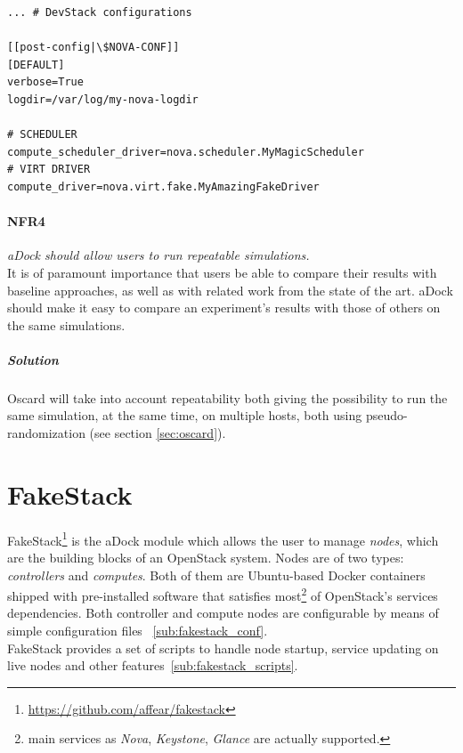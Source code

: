 \begin{lstlisting}[title=Adding per-service configuration to DevStack's local.conf file]
... # DevStack configurations

[[post-config|\$NOVA-CONF]]
[DEFAULT]
verbose=True
logdir=/var/log/my-nova-logdir

# SCHEDULER
compute_scheduler_driver=nova.scheduler.MyMagicScheduler
# VIRT DRIVER
compute_driver=nova.virt.fake.MyAmazingFakeDriver
\end{lstlisting}


\paragraph{NFR4}\label{p:nfr4} \emph{aDock should allow users to run repeatable simulations.} \hfill \\
It is of paramount importance that users be able to compare their results with baseline approaches, as well as with related work from the state of the art. aDock should make it easy to compare an experiment's results with those of others on the same simulations.

\subparagraph{Solution} Oscard will take into account repeatability both giving the possibility to run the same simulation, at the same time, on multiple hosts, both using pseudo-randomization (see section \ref{sec:oscard}).


\section{FakeStack}
\label{sec:fakestack}
FakeStack\footnote{\url{https://github.com/affear/fakestack}} is the aDock module which allows the user to manage \textit{nodes}, which are the building blocks of an OpenStack system. Nodes are of two types: \textit{controllers} and \textit{computes}. Both of them are Ubuntu-based Docker containers shipped with pre-installed software that satisfies most\footnote{main services as \textit{Nova}, \textit{Keystone}, \textit{Glance} are actually supported.} of OpenStack's services dependencies. Both controller and compute nodes are configurable by means of simple configuration files ~\ref{sub:fakestack_conf}.\\
FakeStack provides a set of scripts to handle node startup, service updating on live nodes and other features~\ref{sub:fakestack_scripts}.

